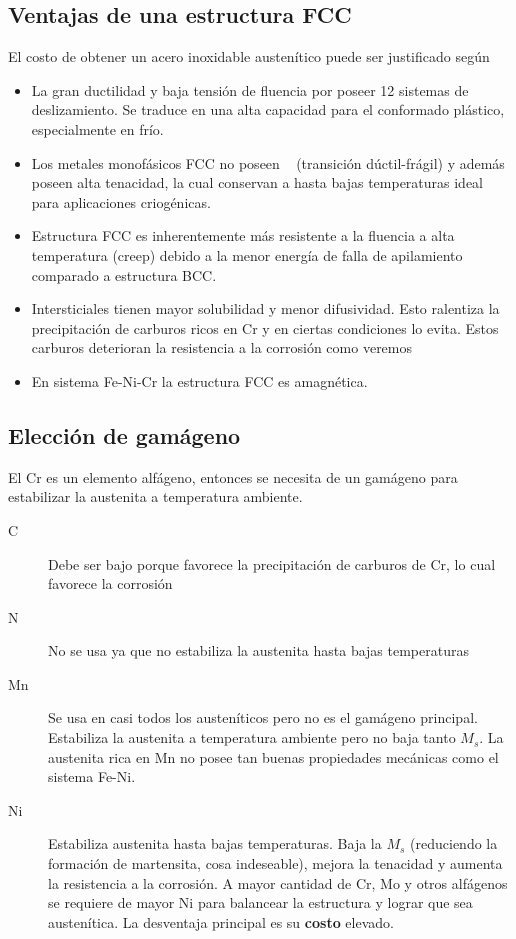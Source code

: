 \subsection{Ventajas de una estructura FCC}
El costo de obtener un acero inoxidable austenítico puede ser justificado según
\begin{itemize}
	\item La gran ductilidad y baja tensión de fluencia por poseer 12 sistemas de deslizamiento. Se traduce en una alta capacidad para el conformado plástico, especialmente en frío.
	\item Los metales monofásicos FCC no poseen \Tdf~ (transición dúctil-frágil) y además poseen alta tenacidad, la cual conservan a hasta bajas temperaturas ideal para aplicaciones criogénicas.
	\item Estructura FCC es inherentemente más resistente a la fluencia a alta temperatura (creep) debido a la menor energía de falla de apilamiento comparado a estructura BCC.
	\item Intersticiales tienen mayor solubilidad y menor difusividad. Esto ralentiza la precipitación de carburos ricos en Cr y en ciertas condiciones lo evita. Estos carburos deterioran la resistencia a la corrosión como veremos
	\item En sistema Fe-Ni-Cr la estructura FCC es amagnética.
\end{itemize}



\subsection{Elección de gamágeno}
El Cr es un elemento alfágeno, entonces se necesita de un gamágeno para estabilizar la austenita a temperatura ambiente.
\begin{description}
	\item[C] Debe ser bajo porque favorece la precipitación de carburos de Cr, lo cual favorece la corrosión
	\item[N] No se usa ya que no estabiliza la austenita hasta bajas temperaturas
	\item[Mn] Se usa en casi todos los austeníticos pero no es el gamágeno principal. Estabiliza la austenita a temperatura ambiente pero no baja tanto $M_s$. La austenita rica en Mn no posee tan buenas propiedades mecánicas como el sistema Fe-Ni.
	\item[Ni] Estabiliza austenita hasta bajas temperaturas. Baja la $M_s$ (reduciendo la formación de martensita, cosa indeseable), mejora la tenacidad y aumenta la resistencia a la corrosión. A mayor cantidad de Cr, Mo y otros alfágenos se requiere de mayor Ni para balancear la estructura y lograr que sea austenítica. La desventaja principal es su \textbf{costo} elevado.
\end{description}

